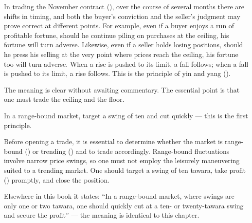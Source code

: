 
\begin{sokyubox}
{\small\itshape\color{sokyubar} }

\medskip
In trading the November contract (), over
the course of several months there are shifts in timing, and both
the buyer's conviction and the seller's judgment may prove correct
at different points. For example, even if a buyer enjoys a run of
profitable fortune, should he continue piling on purchases at the
ceiling, his fortune will turn adverse. Likewise, even if a seller
holds losing positions, should he press his selling at the very
point where prices reach the ceiling, his fortune too will turn
adverse. When a rise is pushed to its limit, a fall follows; when
a fall is pushed to its limit, a rise follows. This is the
principle of yin and yang ().
\end{sokyubox}

\commentary
The meaning is clear without awaiting commentary. The essential point
is that one must trade the ceiling and the floor.


\begin{sokyubox}
{\small\itshape\color{sokyubar} }

\medskip
In a range-bound market, target a swing of ten 
and cut quickly --- this is the first principle.
\end{sokyubox}

\commentary
Before opening a trade, it is essential to determine whether the
market is range-bound () or trending
() and to trade accordingly. Range-bound
fluctuations involve narrow price swings, so one must not employ the
leisurely maneuvering suited to a trending market. One should target
a swing of ten tawara, take profit () promptly, and
close the position.

Elsewhere in this book it states: ``In a range-bound market, where
swings are only one or two tawara, one should quickly cut at a ten-
or twenty-tawara swing and secure the profit'' --- the meaning is
identical to this chapter.
